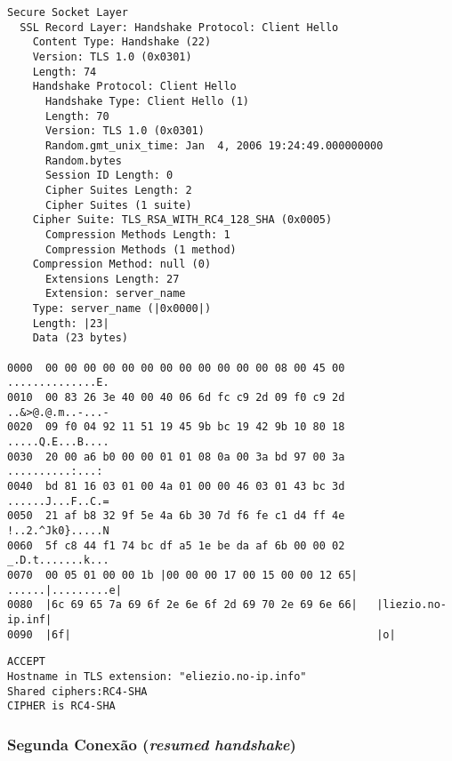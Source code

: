 \begin{lstlisting}[caption=Primeira Conexão -- Decodificação da mensagem \tlsHsCh]
Secure Socket Layer 
  SSL Record Layer: Handshake Protocol: Client Hello 
    Content Type: Handshake (22) 
    Version: TLS 1.0 (0x0301) 
    Length: 74 
    Handshake Protocol: Client Hello 
      Handshake Type: Client Hello (1) 
      Length: 70 
      Version: TLS 1.0 (0x0301) 
      Random.gmt_unix_time: Jan  4, 2006 19:24:49.000000000 
      Random.bytes 
      Session ID Length: 0 
      Cipher Suites Length: 2 
      Cipher Suites (1 suite) 
	Cipher Suite: TLS_RSA_WITH_RC4_128_SHA (0x0005) 
      Compression Methods Length: 1 
      Compression Methods (1 method) 
	Compression Method: null (0) 
      Extensions Length: 27 
      Extension: server_name 
	Type: server_name (|0x0000|)
	Length: |23|
	Data (23 bytes) 

0000  00 00 00 00 00 00 00 00 00 00 00 00 08 00 45 00   ..............E. 
0010  00 83 26 3e 40 00 40 06 6d fc c9 2d 09 f0 c9 2d   ..&>@.@.m..-...- 
0020  09 f0 04 92 11 51 19 45 9b bc 19 42 9b 10 80 18   .....Q.E...B.... 
0030  20 00 a6 b0 00 00 01 01 08 0a 00 3a bd 97 00 3a    ..........:...: 
0040  bd 81 16 03 01 00 4a 01 00 00 46 03 01 43 bc 3d   ......J...F..C.= 
0050  21 af b8 32 9f 5e 4a 6b 30 7d f6 fe c1 d4 ff 4e   !..2.^Jk0}.....N 
0060  5f c8 44 f1 74 bc df a5 1e be da af 6b 00 00 02   _.D.t.......k... 
0070  00 05 01 00 00 1b |00 00 00 17 00 15 00 00 12 65|   ......|.........e| 
0080  |6c 69 65 7a 69 6f 2e 6e 6f 2d 69 70 2e 69 6e 66|   |liezio.no-ip.inf|
0090  |6f|                                                |o|
\end{lstlisting}

\begin{lstlisting}[caption=Primeira Conexão -- Saída da aplicação {\tt s\_server}]
ACCEPT 
Hostname in TLS extension: "eliezio.no-ip.info" 
Shared ciphers:RC4-SHA 
CIPHER is RC4-SHA
\end{lstlisting}

\subsubsection{Segunda Conexão (\emph{resumed handshake})}

